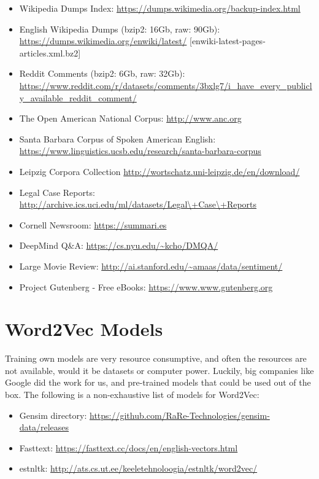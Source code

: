 \begin{itemize}
    \setlength\itemsep{0em}
    \item Wikipedia Dumps Index: \url{https://dumps.wikimedia.org/backup-index.html}
    \item English Wikipedia Dumps (bzip2: 16Gb, raw: 90Gb): \url{https://dumps.wikimedia.org/enwiki/latest/} [enwiki-latest-pages-articles.xml.bz2]
    \item Reddit Comments (bzip2: 6Gb, raw: 32Gb): \url{https://www.reddit.com/r/datasets/comments/3bxlg7/i_have_every_publicly_available_reddit_comment/}
    \item The Open American National Corpus: \url{http://www.anc.org}
    \item Santa Barbara Corpus of Spoken American English: \url{https://www.linguistics.ucsb.edu/research/santa-barbara-corpus}
    \item Leipzig Corpora Collection \url{http://wortschatz.uni-leipzig.de/en/download/}
    \item Legal Case Reports: \url{http://archive.ics.uci.edu/ml/datasets/Legal\+Case\+Reports}
    \item Cornell Newsroom: \url{https://summari.es}
    \item DeepMind Q\&A: \url{https://cs.nyu.edu/\~kcho/DMQA/}
    \item Large Movie Review: \url{http://ai.stanford.edu/\~amaas/data/sentiment/}
    \item Project Gutenberg - Free eBooks: \url{https://www.www.gutenberg.org}
\end{itemize}


\section{Word2Vec Models}
\label{sota:word2vec-models}
Training own models are very resource consumptive, and often the resources are not available, would it be datasets or computer power. Luckily, big companies like Google did the work for us, and pre-trained models that could be used out of the box. The following is a non-exhaustive list of models for Word2Vec:

\begin{itemize}
    \setlength\itemsep{0em}
    \item Gensim directory: \url{https://github.com/RaRe-Technologies/gensim-data/releases}
    \item Fasttext: \url{https://fasttext.cc/docs/en/english-vectors.html}
    \item estnltk: \url{http://ats.cs.ut.ee/keeletehnoloogia/estnltk/word2vec/}
\end{itemize}
